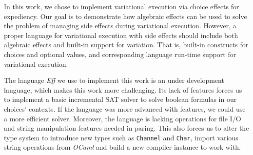 In this work, we chose to implement variational execution via choice effects for expediency. Our goal is to demonstrate how algebraic effects can be used to solve the problem of managing side effects during variational execution. However, a proper language for variational execution with side effects should include both algebraic effects and built-in support for variation. That is, built-in constructs for choices and optional values, and corresponding language run-time support for variational execution. 

The language \emph{Eff} we use to implement this work is an under development language, which makes this work more challenging. Its lack of features forces us to implement a basic incremental SAT solver to solve boolean formulas in our choices' contexts. If the language was more advanced with features, we could use a more efficient solver. Moreover, the language is lacking operations for file I/O and string manipulation features needed in paring. This also forces us to alter the type system to introduce new types such as \texttt{Channel} and \texttt{Char}, import various string operations from \emph{OCaml} and build a new compiler instance to work with. 

